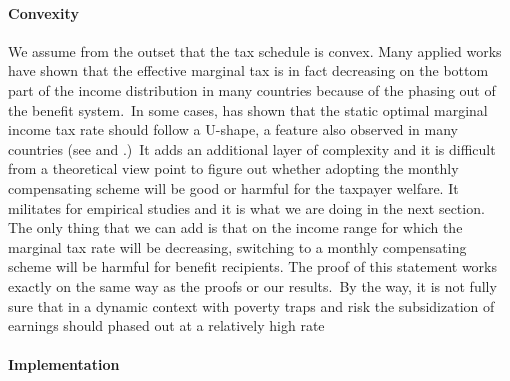 \paragraph{Convexity}

We assume from the outset that the tax schedule is convex. Many applied works
have shown that the effective marginal tax is in fact decreasing on the bottom
part of the income distribution in many countries because of the phasing out
of the benefit system.\ In some cases, \citet{diamond1998optimal} has shown
that the static optimal marginal income tax rate should follow a U-shape, a
feature also observed in many countries (see \citet{diamond2011case} and
\citet{mankiw2009optimal}.)\ It adds an additional layer of complexity and it
is difficult from a theoretical view point to figure out whether adopting the
monthly compensating scheme will be good or harmful for the taxpayer welfare.
It militates for empirical studies and it is what we are doing in the next
section. The only thing that we can add is that on the income range for which
the marginal tax rate will be decreasing, switching to a monthly compensating
scheme will be harmful for benefit recipients. The proof of this statement
works exactly on the same way as the proofs or our results.\ By the way, it is
not fully sure that in a dynamic context with poverty traps and risk the
subsidization of earnings should phased out at a relatively high rate

\paragraph{Implementation}

